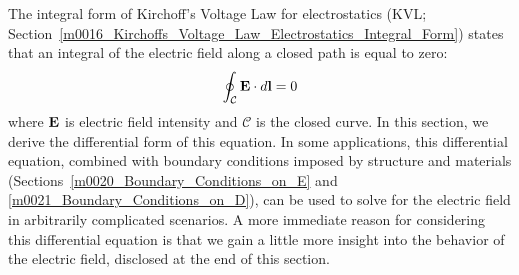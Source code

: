 

\label{m0152_KVL_Electrostatics_Integral-to-Differential} %

The integral form of Kirchoff's Voltage Law for electrostatics (KVL; Section~\ref{m0016_Kirchoffs_Voltage_Law_Electrostatics_Integral_Form}) states that an integral of the electric field along a closed path is equal to zero:
%
\begin{equation}
\oint_{\mathcal C}{ {\bf E} \cdot d{\bf l} } = 0  
\end{equation}
%
where ${\bf E}$ is electric field intensity and ${\mathcal C}$ is the closed curve.
In this section, we derive the differential form of this equation.
In some applications, this differential equation, combined with boundary conditions imposed by structure and materials (Sections~\ref{m0020_Boundary_Conditions_on_E} and \ref{m0021_Boundary_Conditions_on_D}), can be used to solve for the electric field in arbitrarily complicated scenarios.  
A more immediate reason for considering this differential equation is that we gain a little more insight into the behavior of the electric field, disclosed at the end of this section.

